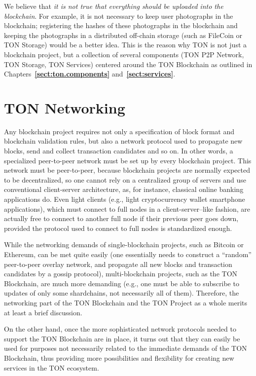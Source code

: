 \documentclass[12pt,oneside]{article}
\def\refpoint#1{{\rm\textbf{\ref{#1}}}}
\let\ptref=\refpoint
\def\mysection#1{\section{#1}\fancyhead[C]{\textsc{Chapter \textbf{\thesection.} #1}}}
\begin{document}
We believe that {\em it is not true that everything should be uploaded
  into the blockchain}. For example, it is not necessary to keep user
photographs in the blockchain; registering the hashes of these
photographs in the blockchain and keeping the photographs in a
distributed off-chain storage (such as FileCoin or TON Storage) would
be a better idea. This is the reason why TON is not just a blockchain
project, but a collection of several components (TON P2P Network, TON
Storage, TON Services) centered around the TON Blockchain as outlined
in Chapters~\ptref{sect:ton.components} and~\ptref{sect:services}.

%
%
%
%

\clearpage
\mysection{TON Networking}\label{sect:network}

Any blockchain project requires not only a specification of block
format and blockchain validation rules, but also a network protocol
used to propagate new blocks, send and collect transaction candidates
and so on. In other words, a specialized peer-to-peer network must be
set up by every blockchain project. This network must be peer-to-peer,
because blockchain projects are normally expected to be decentralized,
so one cannot rely on a centralized group of servers and use
conventional client-server architecture, as, for instance, classical
online banking applications do. Even light clients (e.g., light
cryptocurrency wallet smartphone applications), which must connect to
full nodes in a client-server--like fashion, are actually free to
connect to another full node if their previous peer goes down,
provided the protocol used to connect to full nodes is standardized
enough.

While the networking demands of single-blockchain projects, such as
Bitcoin or Ethereum, can be met quite easily (one essentially needs to
construct a ``random'' peer-to-peer overlay network, and propagate all
new blocks and transaction candidates by a gossip protocol),
multi-blockchain projects, such as the TON Blockchain, are much more
demanding (e.g., one must be able to subscribe to updates of only some
shardchains, not necessarily all of them). Therefore, the networking
part of the TON Blockchain and the TON Project as a whole merits at
least a brief discussion.

On the other hand, once the more sophisticated network protocols
needed to support the TON Blockchain are in place, it turns out that
they can easily be used for purposes not necessarily related to the
immediate demands of the TON Blockchain, thus providing more
possibilities and flexibility for creating new services in the TON
ecosystem.
\end{document}
